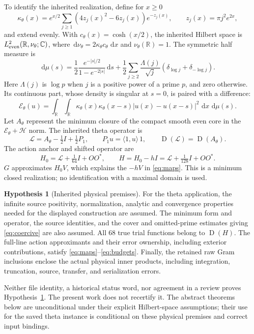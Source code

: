 \documentclass[11pt,a4paper]{article}
\newcommand{\HH}{\mathcal H}
\newcommand{\C}{\mathbb C}
\newcommand{\R}{\mathbb R}
\newcommand{\Dom}{\operatorname{D}}
\newcommand{\ip}[2]{\langle #1,#2\rangle}
\newcommand{\dd}{\,\mathrm d}
\theoremstyle{definition}
\newtheorem{hypothesis}[theorem]{Hypothesis}
\theoremstyle{remark}
\numberwithin{equation}{section}
\begin{document}
To identify the inherited realization, define for $x\ge0$
\[
 \kappa_\theta(x)=e^{x/2}\sum_{j\ge1}
 (4z_j(x)^2-6z_j(x))e^{-z_j(x)},\qquad
 z_j(x)=\pi j^2e^{2x},
\]
and extend evenly. With $c_\theta(x)=\cosh(x/2)$, the inherited Hilbert
space is $L^2_{\rm even}(\R,\nu_\theta;\C)$, where
$\dd\nu_\theta=2\kappa_\theta c_\theta\,\dd x$ and
$\nu_\theta(\R)=1$. The symmetric half measure is
\[
 \dd\mu(s)=\frac12\frac{e^{-|s|/2}}{1-e^{-2|s|}}\dd s+
 \frac12\sum_{j\ge2}\frac{\Lambda(j)}{\sqrt j}
       (\delta_{\log j}+\delta_{-\log j}).
\]
Here $\Lambda(j)$ is $\log p$ when $j$ is a positive power of a prime
$p$, and zero otherwise.
Its continuous part, whose density is singular at $s=0$, is paired with
a difference:
\[
 \mathcal E_\theta(u)=
 \int_{\R}\int_{\R}\kappa_\theta(x)\kappa_\theta(x-s)
       |u(x)-u(x-s)|^2\,\dd x\,\dd\mu(s).
\]
Let $A_\theta$ represent the minimum closure of the compact smooth even
core in the $\mathcal E_\theta+\HH$ norm. The inherited theta operator is
\[
 \mathcal L=A_\theta-\tfrac12 I+\tfrac12 P_1,\qquad
 P_1u=\ip1u\,1,\qquad \Dom(\mathcal L)=\Dom(A_\theta).
\]
The action anchor and shifted operator are
\begin{equation}\label{eq:thetaH}
 H_0=\mathcal L+\tfrac1{64}I+OO^*,\qquad
 H=H_0-hI=\mathcal L+\tfrac1{128}I+OO^*.
\end{equation}
$G$ approximates $H_0V$, which explains the $-hV$ in
\eqref{eq:maps}. This is a minimum closed realization; no identification
with a maximal domain is used.

\begin{hypothesis}[Inherited physical premises]\label{hyp:physical}
For the theta application, the infinite source positivity,
normalization, analytic and convergence properties needed for the
displayed construction are assumed. The minimum form and operator,
the source identities, and the cover and omitted-prime estimates giving
\eqref{eq:coercive} are also assumed. All 68 true trial functions belong
to $\Dom(H)$. The full-line action approximants and their error ownership,
including exterior contributions, satisfy \eqref{eq:maps}--\eqref{eq:budgets}.
Finally, the retained raw Gram inclusions enclose the actual physical
inner products, including integration, truncation, source, transfer,
and serialization errors.
\end{hypothesis}

Neither file identity, a historical status word, nor agreement in a
review proves Hypothesis~\ref{hyp:physical}. The present work does not
recertify it. The abstract theorems below are unconditional under their
explicit Hilbert-space assumptions; their use for the saved theta
instance is conditional on these physical premises and correct input
bindings.
\end{document}
